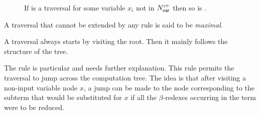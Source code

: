 \begin{definition}
\begin{description}
\item[]
If  is a traversal for some variable
    $x_i$ not in $N_{\sf var}^{r\vdash}$ then
so is .
\end{description}
A traversal that cannot be extended by any rule is said to be \emph{maximal}.
\end{definition}


A traversal always starts by visiting the root. Then it mainly
follows the structure of the tree.

The  rule is particular and needs further explanation.
This rule permits the traversal to jump across the computation tree. The idea is that after visiting a
non-input variable node $x$, a jump can be made to the node corresponding to
the subterm that would be substituted for $x$ if all the
$\beta$-redexes occurring in the term were to be reduced.


